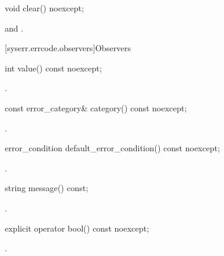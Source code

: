 %
\begin{itemdecl}
void clear() noexcept;
\end{itemdecl}

\begin{itemdescr}
\pnum
\ensures
{} and .
\end{itemdescr}


[syserr.errcode.observers]{Observers}

%
\begin{itemdecl}
int value() const noexcept;
\end{itemdecl}

\begin{itemdescr}
\pnum
\returns
{}.
\end{itemdescr}

%
\begin{itemdecl}
const error_category& category() const noexcept;
\end{itemdecl}

\begin{itemdescr}
\pnum
\returns
{}.
\end{itemdescr}

%
\begin{itemdecl}
error_condition default_error_condition() const noexcept;
\end{itemdecl}

\begin{itemdescr}
\pnum
\returns
{}.
\end{itemdescr}

%
\begin{itemdecl}
string message() const;
\end{itemdecl}

\begin{itemdescr}
\pnum
\returns
{}.
\end{itemdescr}

%
\begin{itemdecl}
explicit operator bool() const noexcept;
\end{itemdecl}

\begin{itemdescr}
\pnum
\returns
{}.
\end{itemdescr}

